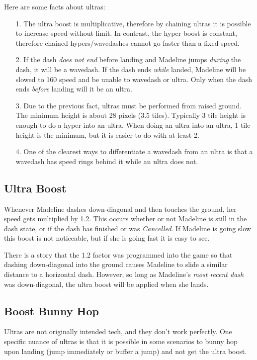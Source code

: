 \documentclass[oneside]{book}
\begin{document}
Here are some facts about ultras:

\begin{itemize}
\item[1.]The ultra boost is multiplicative, therefore by chaining ultras it is possible to increase speed without limit. In contrast, the hyper boost is constant, therefore chained hypers/wavedashes cannot go faster than a fixed speed.
\item[2.]If the dash \textit{does not end} before landing and Madeline jumps \textit{during} the dash, it will be a wavedash. If the dash ends \textit{while} landed, Madeline will be slowed to 160 speed and be unable to wavedash or ultra. Only when the dash ends \textit{before} landing will it be an ultra.
\item[3.]Due to the previous fact, ultras must be performed from raised ground. The minimum height is about 28 pixels (3.5 tiles). Typically 3 tile height is enough to do a hyper into an ultra. When doing an ultra into an ultra, 1 tile height is the minimum, but it is easier to do with at least 2.
\item[4.]One of the clearest ways to differentiate a wavedash from an ultra is that a wavedash has speed rings behind it while an ultra does not.
\end{itemize}

\subsection{Ultra Boost}

Whenever Madeline dashes down-diagonal and then touches the ground, her speed gets multiplied by 1.2. This occurs whether or not Madeline is still in the dash state, or if the dash has finished or was \textit{Cancelled}. If Madeline is going slow this boost is not noticeable, but if she is going fast it is easy to see.

There is a story that the 1.2 factor was programmed into the game so that dashing down-diagonal into the ground causes Madeline to slide a similar distance to a horizontal dash. However, so long as Madeline's \textit{most recent dash} was down-diagonal, the ultra boost will be applied when she lands.

\subsection{Boost Bunny Hop}

Ultras are not originally intended tech, and they don't work perfectly. One specific nuance of ultras is that it is possible in some scenarios to bunny hop upon landing (jump immediately or buffer a jump) and not get the ultra boost.
\end{document}
